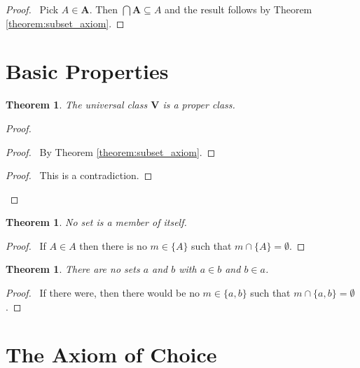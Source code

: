 \documentclass{report}
\let\qed\relax
\newtheorem{theorem}[axiom]{Theorem}
\theoremstyle{definition}
\begin{document}
    \begin{proof}
        \pf\ Pick $A \in \mathbf{A}$. Then $\bigcap \mathbf{A} \subseteq A$ and the result follows by
        Theorem \ref{theorem:subset_axiom}. \qed
    \end{proof}
    
    \section{Basic Properties}

    \begin{theorem}
        The universal class $\mathbf{V}$ is a proper class.
    \end{theorem}

    \begin{proof}
        \pf
        \begin{proof}
            \pf\ By Theorem \ref{theorem:subset_axiom}.
        \end{proof}
        \qedstep
        \begin{proof}
            \pf\ This is a contradiction.
        \end{proof}
        \qed
    \end{proof}

    \begin{theorem}
        No set is a member of itself.
    \end{theorem}

    \begin{proof}
        \pf\ If $A \in A$ then there is no $m \in \{A\}$ such that $m \cap \{A\} = \emptyset$. \qed
    \end{proof}

    \begin{theorem}
        There are no sets $a$ and $b$ with $a \in b$ and $b \in a$.
    \end{theorem}

    \begin{proof}
        \pf\ If there were, then there would be no $m \in \{ a,b \}$ such that  $m \cap \{ a,b \} = \emptyset$. \qed
    \end{proof}

    \section{The Axiom of Choice}
\end{document}
